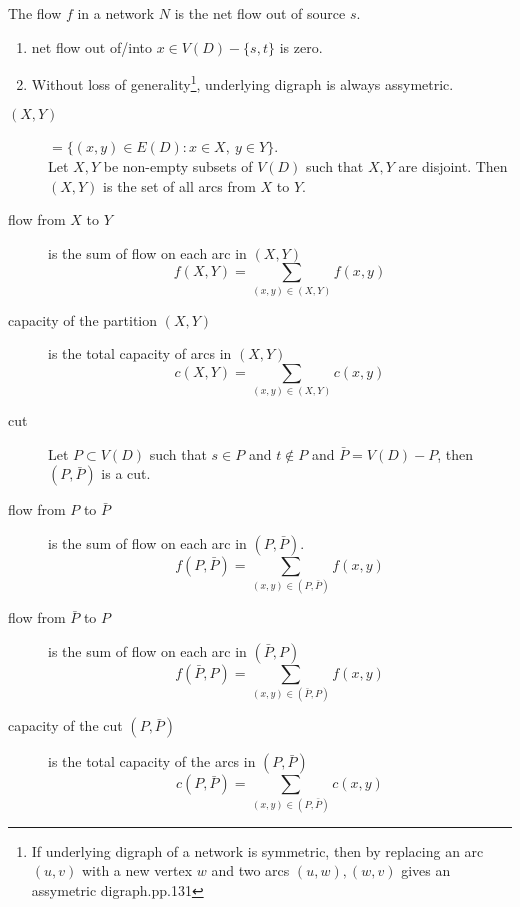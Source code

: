 \begin{definition}
	The flow $f$ in a network $N$ is the net flow out of source $s$.
\end{definition}
\begin{remark}
	\begin{enumerate}
		\item net flow out of/into $x \in V(D)-\{s,t\}$ is zero.
		\item Without loss of generality\footnote{If underlying digraph of a network is symmetric, then by replacing an arc $(u,v)$ with a new vertex $w$ and two arcs $(u,w),(w,v)$ gives an assymetric digraph.\cite{chartrand}pp.131}, underlying digraph is always assymetric.
	\end{enumerate}
\end{remark}
\begin{description}
	\item[$(X,Y)$] $=\{ (x,y) \in E(D) : x \in X,\ y \in Y \}$.\\
		Let $X,Y$ be non-empty subsets of $V(D)$ such that $X,Y$ are disjoint. Then $(X,Y)$ is the set of all arcs from $X$ to $Y$.
	\item[flow from $X$ to $Y$] is the sum of flow on each arc in $(X,Y)$
		\begin{equation}
		f(X,Y) = \sum_{(x,y) \in (X,Y)} f(x,y)
		\end{equation}
	\item[capacity of the partition $(X,Y)$] is the total capacity of arcs in $(X,Y)$
		\begin{equation}
		c(X,Y) = \sum_{(x,y) \in (X,Y)} c(x,y)
		\end{equation}
	\item[cut] Let $P \subset V(D)$ such that $s \in P$ and $t \not\in P$ and $\bar{P} = V(D)-P$, then $(P,\bar{P})$ is a cut.
	\item[flow from $P$ to $\bar{P}$] is the sum of flow on each arc in $(P,\bar{P})$.
		\begin{equation}
		f(P,\bar{P}) = \sum_{(x,y) \in (P,\bar{P})} f(x,y)
		\end{equation}
	\item[flow from $\bar{P}$ to $P$] is the sum of flow on each arc in $(\bar{P},P)$
		\begin{equation}
		f(\bar{P},P) = \sum_{(x,y) \in (\bar{P},P)} f(x,y)
		\end{equation}
	\item[capacity of the cut $(P,\bar{P})$] is the total capacity of the arcs in $(P,\bar{P})$
		\begin{equation}
		c(P,\bar{P}) = \sum_{(x,y) \in (P,\bar{P})} c(x,y)
		\end{equation}
\end{description}
